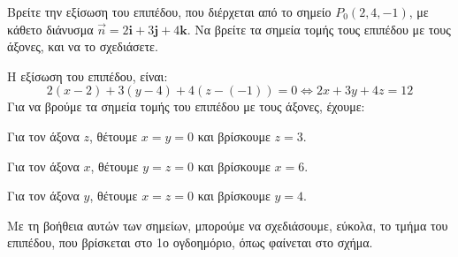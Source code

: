 \begin{example}
  Βρείτε την εξίσωση του επιπέδου, που διέρχεται από το σημείο $ P_{0}(2,4,-1) $, με 
  κάθετο διάνυσμα $ \vec{n} = 2 \mathbf{i} + 3 \mathbf{j} + 4 \mathbf{k} $. Να βρείτε 
  τα σημεία τομής τους επιπέδου με τους άξονες, και να το σχεδιάσετε.
\end{example}
\begin{solution}
  Η εξίσωση του επιπέδου, είναι:
  \[
    2(x-2)+3(y-4)+4(z-(-1)) = 0 \Leftrightarrow 2x+3y+4z=12
  \]
  Για να βρούμε τα σημεία τομής του επιπέδου με τους άξονες, έχουμε:
  \begin{myitemize}
    \item Για τον άξονα $z$, θέτουμε $ x=y=0 $ και βρίσκουμε $ z=3 $.
    \item Για τον άξονα $x$, θέτουμε $ y=z=0 $ και βρίσκουμε $ x=6 $.
    \item Για τον άξονα $y$, θέτουμε $ x=z=0 $ και βρίσκουμε $ y=4 $.
  \end{myitemize}
  Με τη βοήθεια αυτών των σημείων, μπορούμε να σχεδιάσουμε, εύκολα, το τμήμα του 
  επιπέδου, που βρίσκεται στο 1ο ογδοημόριο, όπως φαίνεται στο σχήμα.
\end{solution}

